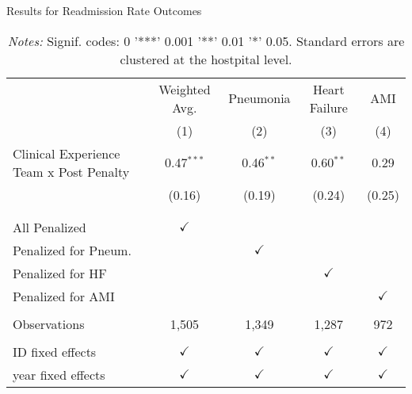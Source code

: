 \begin{table}[ht!]
\caption{Results for Readmission Rate Outcomes}
\begin{tabular}{lcccc}
\toprule
 & Weighted Avg. & Pneumonia & Heart Failure & AMI\\
 & (1) & (2) & (3) & (4)\\
\midrule Clinical Experience Team x Post Penalty & 0.47$^{***}$ & 0.46$^{**}$ & 0.60$^{**}$ & 0.29\\
  & (0.16) & (0.19) & (0.24) & (0.25)\\
  \\
  \\
All Penalized & $\checkmark$ &  &  & \\
Penalized for Pneum. &  & $\checkmark$ &  & \\
Penalized for HF &  &  & $\checkmark$ & \\
Penalized for AMI &  &  &  & $\checkmark$\\
  &   &   &   &  \\
Observations & 1,505 & 1,349 & 1,287 & 972\\
  &   &   &   &  \\
ID fixed effects & $\checkmark$ & $\checkmark$ & $\checkmark$ & $\checkmark$\\
year fixed effects & $\checkmark$ & $\checkmark$ & $\checkmark$ & $\checkmark$\\
\bottomrule
\end{tabular}
\caption*{\footnotesize{\textit{Notes:} Signif. codes:  0 '***' 0.001 '**' 0.01 '*' 0.05. Standard errors are clustered at the hostpital level.}}
\end{table}